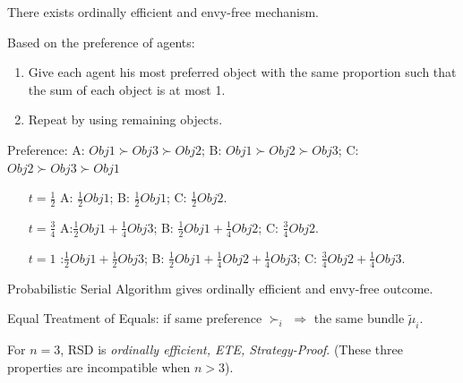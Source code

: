 \documentclass[11pt]{elegantbook}
\begin{document}
There exists ordinally efficient and envy-free mechanism.
\begin{definition}
    \normalfont
    Based on the preference of agents:
    \begin{enumerate}
        \item Give each agent his most preferred object with the same proportion such that the sum of each object is at most 1.
        \item Repeat by using remaining objects.
    \end{enumerate}
    \begin{example}
        Preference: A: $Obj1\succ Obj3\succ Obj2$; B: $Obj1\succ Obj2 \succ Obj3$; C: $Obj2\succ Obj3\succ Obj1$
        \begin{enumerate}
            \item [$t=\frac{1}{2}$] A: $\frac{1}{2} Obj 1$; B: $\frac{1}{2} Obj 1$; C: $\frac{1}{2} Obj 2$.
            \item [$t=\frac{3}{4}$] A:$ \frac{1}{2} Obj 1+\frac{1}{4} Obj 3$; B: $\frac{1}{2} Obj 1+\frac{1}{4} Obj 2$; C: $\frac{3}{4} Obj 2$.
            \item [$t=1$] :$ \frac{1}{2} Obj 1+\frac{1}{2} Obj 3$; B: $\frac{1}{2} Obj 1+\frac{1}{4} Obj 2+\frac{1}{4} Obj 3$; C: $\frac{3}{4} Obj 2+\frac{1}{4} Obj 3$.
        \end{enumerate}
    \end{example}
\end{definition}
\begin{theorem}
    Probabilistic Serial Algorithm gives ordinally efficient and envy-free outcome.
\end{theorem}

\begin{definition}
    \normalfont
    Equal Treatment of Equals: if same preference $\succ_i$ $\Rightarrow$ the same bundle $\tilde{\mu}_i$.
\end{definition}


\begin{proposition}
    For $n=3$, RSD is \textit{ordinally efficient, ETE, Strategy-Proof}. (These three properties are incompatible when $n>3$).
\end{proposition}
\end{document}
